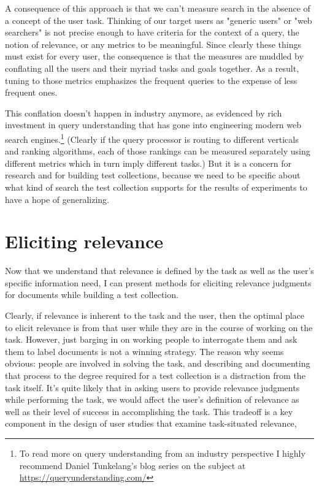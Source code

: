 \documentclass[nobib]{tufte-book}
\begin{document}
A consequence of this approach is that we can't measure search in the absence of a concept of the user task.  Thinking of our target users as "generic users" or "web searchers" is not precise enough to have criteria for the context of a query, the notion of relevance, or any metrics to be meaningful.  Since clearly these things must exist for every user, the consequence is that the measures are muddled by conflating all the users and their myriad tasks and goals together.  As a result, tuning to those metrics emphasizes the frequent queries to the expense of less frequent ones.

This conflation doesn't happen in industry anymore, as evidenced by rich investment in query understanding that has gone into engineering modern web search engines.\footnote{To read more on query understanding from an industry perspective I highly recommend Daniel Tunkelang's blog series on the subject at \url{https://queryunderstanding.com/}} (Clearly if the query processor is routing to different verticals and ranking algorithms, each of those rankings can be measured separately using different metrics which in turn imply different tasks.)  But it is a concern for research and for building test collections, because we need to be specific about what kind of search the test collection supports for the results of experiments to have a hope of generalizing.

\chapter{Eliciting relevance}

Now that we understand that relevance is defined by the task as well as the user's specific information need, I can present methods for eliciting relevance judgments for documents while building a test collection.

Clearly, if relevance is inherent to the task and the user, then the optimal place to elicit relevance is from that user while they are in the course of working on the task.  However, just barging in on working people to interrogate them and ask them to label documents is not a winning strategy.  The reason why seems obvious: people are involved in solving the task, and describing and documenting that process to the degree required for a test collection is a distraction from the task itself.  It's quite likely that in asking users to provide relevance judgments while performing the task, we would affect the user's definition of relevance as well as their level of success in accomplishing the task.  This tradeoff is a key component in the design of user studies that examine task-situated relevance,
\end{document}
